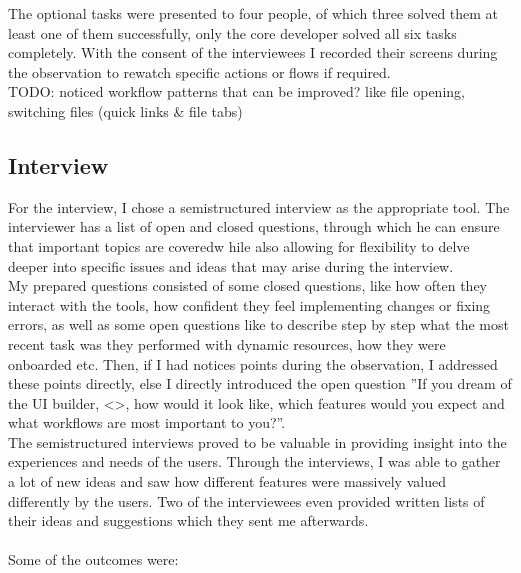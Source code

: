 The optional tasks were presented to four people, of which three solved them at least one of them successfully, only the core developer solved all six tasks completely.
With the consent of the interviewees I recorded their screens during the observation to rewatch specific actions or flows if required.
\\
TODO: noticed workflow patterns that can be improved? like file opening, switching files (quick links \& file tabs)

\subsection{Interview}
\label{subsec:interview}
For the interview, I chose a semistructured interview as the appropriate tool. The interviewer has a list of open and closed questions, through which he can ensure that important topics are coveredw hile also allowing for flexibility to delve deeper into specific issues and ideas that may arise during the interview.
\\
My prepared questions consisted of some closed questions, like how often they interact with the tools, how confident they feel implementing changes or fixing errors, as well as some open questions like to describe step by step what the most recent task was they performed with dynamic resources, how they were onboarded etc.
Then, if I had notices points during the observation, I addressed these points directly, else I directly introduced the open question ''If you dream of the UI builder, <>, how would it look like, which features would you expect and what workflows are most important to you?''.
\\
The semistructured interviews proved to be valuable in providing insight into the experiences and needs of the users. Through the interviews, I was able to gather a lot of new ideas and saw how different features were massively valued differently by the users. Two of the interviewees even provided written lists of their ideas and suggestions which they sent me afterwards.
\\\\
Some of the outcomes were:

